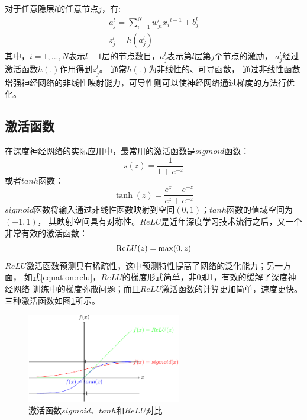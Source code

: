 对于任意隐层$l$的任意节点$j$，有:
\[\begin{array}{l}
a_j^l = \sum\limits_{i = 1}^N {w_{ji}^l {x_i}^{l-1}+ b_j^l} \\
z_j^l = h(a_j^l)
\end{array}\]
其中，$i = 1,...,N$表示$l-1$层的节点数目，$a_j^l$表示第$l$层第$j$个节点的激励，
$a_j^l$经过激活函数$h(.)$作用得到$z_j^l$。
通常$h(.)$为非线性的、可导函数，
通过非线性函数增强神经网络的非线性映射能力，可导性则可以使神经网络通过梯度的方法行优化。

\subsection{激活函数}

在深度神经网络的实际应用中，最常用的激活函数是$sigmoid$函数：
\begin{equation}
s(z) = \frac{1}{{1 + {e^{ - z}}}}
\end{equation}
或者$tanh$函数：
\begin{equation}
\tanh (z) = \frac{{{e^z} - {e^{ - z}}}}{{{e^z} + {e^{ - z}}}}
\end{equation}
$sigmoid$函数将输入通过非线性函数映射到空间$(0,1)$；$tanh$函数的值域空间为$(-1,1)$，
其映射空间具有对称性。$ReLU$是近年深度学习技术流行之后，又一个非常有效的激活函数：
\begin{equation} \label{equation:relu}
{\mathop{\rm Re}\nolimits} LU(z) = \max (0,z)
\end{equation}
$ReLU$激活函数预测具有稀疏性，这中预测特性提高了网络的泛化能力；另一方面，
如式\ref{equation:relu}，$ReLU$的梯度形式简单，非0即1，有效的缓解了深度神经网络
训练中的梯度弥散问题；而且$ReLU$激活函数的计算更加简单，速度更快。
三种激活函数如图\ref{fig:activation}所示。

\begin{figure}[htbp]
\centering
\includegraphics[width=0.6\textwidth]{figures/chapter3/activation-crop}
\caption{激活函数$sigmoid$、$tanh$和$ReLU$对比}
\label{fig:activation}
\end{figure}

